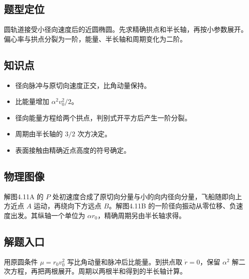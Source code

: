 \documentclass[UTF8,fontset=fandol,a4paper,11pt]{ctexart}
\begin{document}


\subsection*{题型定位}

圆轨道接受小径向速度后的近圆椭圆。先求精确拱点和半长轴，再按小参数展开。偏心率与拱点分裂为一阶，能量、半长轴和周期变化为二阶。



\subsection*{知识点}

\begin{itemize}
\item 径向脉冲与原切向速度正交，比角动量保持。
\item 比能量增加 $\alpha^2v_0^2/2$。
\item 径向能量方程给两个拱点，判别式开平方后产生一阶分裂。
\item 周期由半长轴的 $3/2$ 次方决定。
\item 表面接触由精确近点高度的符号确定。
\end{itemize}




\subsection*{物理图像}

解图4.11A 的 $P$ 处初速度合成了原切向分量与小的向内径向分量，飞船随即向上方近点 $A$ 运动，再绕向下方远点 $B$。解图4.11B 的一阶径向振动从零位移、负速度出发。其纵轴一个单位为 $\alpha r_0$，精确周期另由半长轴求得。



\subsection*{解题入口}

用原圆条件 $\mu=r_0v_0^2$ 写比角动量和脉冲后比能量。到拱点取 $\dot r=0$，保留 $\alpha^2$ 解二次方程，再把两根展开。周期以两根半和得到的半长轴计算。
\end{document}
